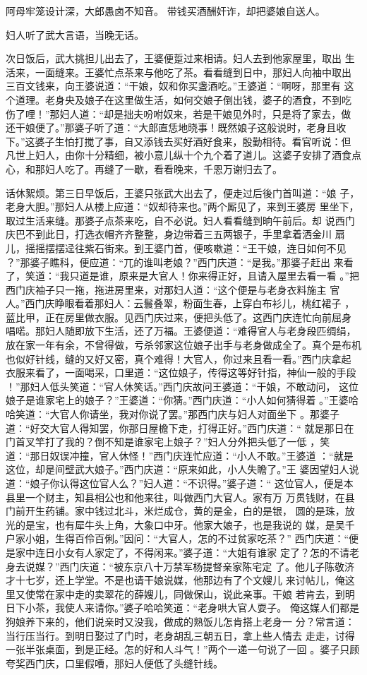 阿母牢笼设计深，大郎愚卤不知音。
带钱买酒酬奸诈，却把婆娘自送人。

妇人听了武大言语，当晚无话。

次日饭后，武大挑担儿出去了，王婆便踅过来相请。妇人去到他家屋里，取出
生活来，一面缝来。王婆忙点茶来与他吃了茶。看看缝到日中，那妇人向袖中取出
三百文钱来，向王婆说道：“干娘，奴和你买盏酒吃。”王婆道：“啊呀，那里有
这个道理。老身央及娘子在这里做生活，如何交娘子倒出钱，婆子的酒食，不到吃
伤了哩！”那妇人道：“却是拙夫吩咐奴来，若是干娘见外时，只是将了家去，做
还干娘便了。”那婆子听了道：“大郎直恁地晓事！既然娘子这般说时，老身且收
下。”这婆子生怕打搅了事，自又添钱去买好酒好食来，殷勤相待。看官听说：但
凡世上妇人，由你十分精细，被小意儿纵十个九个着了道儿。这婆子安排了酒食点
心，和那妇人吃了。再缝了一歇，看看晚来，千恩万谢归去了。

话休絮烦。第三日早饭后，王婆只张武大出去了，便走过后後门首叫道：“娘
子，老身大胆。”那妇人从楼上应道：“奴却待来也。”两个厮见了，来到王婆房
里坐下，取过生活来缝。那婆子点茶来吃，自不必说。妇人看看缝到晌午前后。却
说西门庆巴不到此日，打选衣帽齐齐整整，身边带着三五两银子，手里拿着洒金川
扇儿，摇摇摆摆迳往紫石街来。到王婆门首，便咳嗽道：“王干娘，连日如何不见
？”那婆子瞧科，便应道：“兀的谁叫老娘？”西门庆道：“是我。”那婆子赶出
来看了，笑道：“我只道是谁，原来是大官人！你来得正好，且请入屋里去看一看
。”把西门庆袖子只一拖，拖进房里来，对那妇人道：“这个便是与老身衣料施主
官人。”西门庆睁眼看着那妇人：云鬟叠翠，粉面生春，上穿白布衫儿，桃红裙子
，蓝比甲，正在房里做衣服。见西门庆过来，便把头低了。这西门庆连忙向前屈身
唱喏。那妇人随即放下生活，还了万福。王婆便道：“难得官人与老身段匹绸绢，
放在家一年有余，不曾得做，亏杀邻家这位娘子出手与老身做成全了。真个是布机
也似好针线，缝的又好又密，真个难得！大官人，你过来且看一看。”西门庆拿起
衣服来看了，一面喝采，口里道：“这位娘子，传得这等好针指，神仙一般的手段
！”那妇人低头笑道：“官人休笑话。”西门庆故问王婆道：“干娘，不敢动问，
这位娘子是谁家宅上的娘子？”王婆道：“你猜。”西门庆道：“小人如何猜得着
。”王婆哈哈笑道：“大官人你请坐，我对你说了罢。”那西门庆与妇人对面坐下
。那婆子道：“好交大官人得知罢，你那日屋檐下走，打得正好。”西门庆道：“
就是那日在门首叉竿打了我的？倒不知是谁家宅上娘子？”妇人分外把头低了一低
，笑道：“那日奴误冲撞，官人休怪！”西门庆连忙应道：“小人不敢。”王婆道
：“就是这位，却是间壁武大娘子。”西门庆道：“原来如此，小人失瞻了。”王
婆因望妇人说道：“娘子你认得这位官人么？”妇人道：“不识得。”婆子道：“
这位官人，便是本县里一个财主，知县相公也和他来往，叫做西门大官人。家有万
万贯钱财，在县门前开生药铺。家中钱过北斗，米烂成仓，黄的是金，白的是银，
圆的是珠，放光的是宝，也有犀牛头上角，大象口中牙。他家大娘子，也是我说的
媒，是吴千户家小姐，生得百伶百俐。”因问：“大官人，怎的不过贫家吃茶？”
西门庆道：“便是家中连日小女有人家定了，不得闲来。”婆子道：“大姐有谁家
定了？怎的不请老身去说媒？”西门庆道：“被东京八十万禁军杨提督亲家陈宅定
了。他儿子陈敬济才十七岁，还上学堂。不是也请干娘说媒，他那边有了个文嫂儿
来讨帖儿，俺这里又使常在家中走的卖翠花的薛嫂儿，同做保山，说此亲事。干娘
若肯去，到明日下小茶，我使人来请你。”婆子哈哈笑道：“老身哄大官人耍子。
俺这媒人们都是狗娘养下来的，他们说亲时又没我，做成的熟饭儿怎肯搭上老身一
分？常言道：当行压当行。到明日娶过了门时，老身胡乱三朝五日，拿上些人情去
走走，讨得一张半张桌面，到是正经。怎的好和人斗气！”两个一递一句说了一回
。婆子只顾夸奖西门庆，口里假嘈，那妇人便低了头缝针线。

